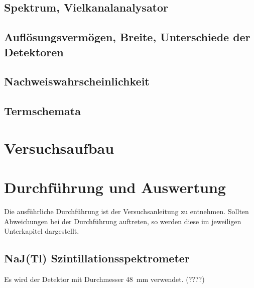 \documentclass[11pt, a4paper]{article}
\numberwithin{equation}{section}
\begin{document}
\subsection{Spektrum, Vielkanalanalysator}

\subsection{Auflösungsvermögen, Breite, Unterschiede der Detektoren}

\subsection{Nachweiswahrscheinlichkeit}

\subsection{Termschemata}


\section{Versuchsaufbau}

\section{Durchführung und Auswertung}
Die ausführliche Durchführung ist der Versuchsanleitung \cite{anleitung} zu entnehmen.
Sollten Abweichungen bei der Durchführung auftreten, so werden diese im jeweiligen Unterkapitel dargestellt.

\subsection{NaJ(Tl) Szintillationsspektrometer}
Es wird der Detektor mit Durchmesser \SI{48}{mm} verwendet. (????)
\end{document}
